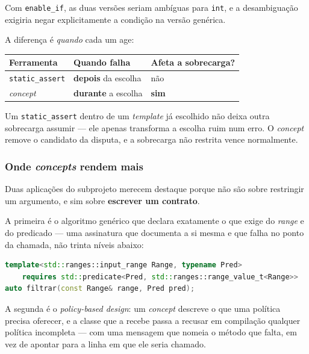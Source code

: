 Com \texttt{enable\_if}, as duas versões seriam ambíguas para \texttt{int}, e a
desambiguação exigiria negar explicitamente a condição na versão genérica.

\begin{regra}
A diferença é \emph{quando} cada um age:
\begin{center}\footnotesize
\begin{tabular}{@{}lll@{}}
\toprule
\textbf{Ferramenta} & \textbf{Quando falha} & \textbf{Afeta a sobrecarga?} \\
\midrule
\texttt{static\_assert} & \textbf{depois} da escolha & não \\
\emph{concept}          & \textbf{durante} a escolha & \textbf{sim} \\
\bottomrule
\end{tabular}
\end{center}
Um \texttt{static\_assert} dentro de um \emph{template} já escolhido não deixa
outra sobrecarga assumir --- ele apenas transforma a escolha ruim num erro. O
\emph{concept} remove o candidato da disputa, e a sobrecarga não restrita vence
normalmente.
\end{regra}

\subsubsection{Onde \emph{concepts} rendem mais}

Duas aplicações do subprojeto merecem destaque porque não são sobre restringir
um argumento, e sim sobre \textbf{escrever um contrato}.

A primeira é o algoritmo genérico que declara exatamente o que exige do
\emph{range} e do predicado --- uma assinatura que documenta a si mesma e que
falha no ponto da chamada, não trinta níveis abaixo:

\begin{lstlisting}[style=bt, language=C++,
    caption={O contrato inteiro na assinatura.}]
template<std::ranges::input_range Range, typename Pred>
    requires std::predicate<Pred, std::ranges::range_value_t<Range>>
auto filtrar(const Range& range, Pred pred);
\end{lstlisting}

A segunda é o \emph{policy-based design}: um \emph{concept} descreve o que uma
política precisa oferecer, e a classe que a recebe passa a recusar em compilação
qualquer política incompleta --- com uma mensagem que nomeia o método que falta,
em vez de apontar para a linha em que ele seria chamado.

